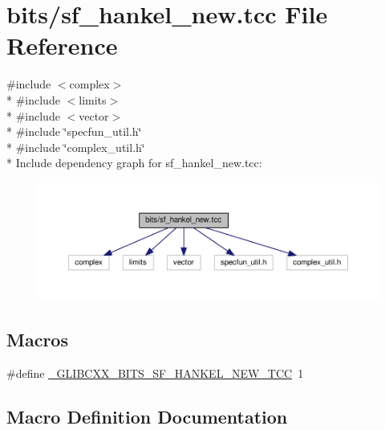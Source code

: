 \hypertarget{sf__hankel__new_8tcc}{}\section{bits/sf\+\_\+hankel\+\_\+new.tcc File Reference}
\label{sf__hankel__new_8tcc}
{\ttfamily \#include $<$complex$>$}\\*
{\ttfamily \#include $<$limits$>$}\\*
{\ttfamily \#include $<$vector$>$}\\*
{\ttfamily \#include \char`\"{}specfun\+\_\+util.\+h\char`\"{}}\\*
{\ttfamily \#include \char`\"{}complex\+\_\+util.\+h\char`\"{}}\\*
Include dependency graph for sf\+\_\+hankel\+\_\+new.\+tcc\+:
\nopagebreak
\begin{figure}[H]
\begin{center}
\leavevmode
\includegraphics[width=350pt]{sf__hankel__new_8tcc__incl}
\end{center}
\end{figure}
\subsection*{Macros}
\begin{DoxyCompactItemize}
\item 
\#define \hyperlink{sf__hankel__new_8tcc_a3f0d94d8fb94ad2e003fd0b54ce51a6d}{\+\_\+\+G\+L\+I\+B\+C\+X\+X\+\_\+\+B\+I\+T\+S\+\_\+\+S\+F\+\_\+\+H\+A\+N\+K\+E\+L\+\_\+\+N\+E\+W\+\_\+\+T\+C\+C}~1
\end{DoxyCompactItemize}


\subsection{Macro Definition Documentation}
\hypertarget{sf__hankel__new_8tcc_a3f0d94d8fb94ad2e003fd0b54ce51a6d}{}
